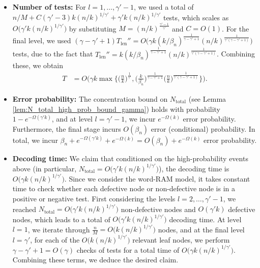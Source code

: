 \begin{itemize}
    \item \textbf{Number of tests:} For $l=1,\dots,\gamma'-1$, we used a total of $n/M+ C(\gamma'-3)k(n/k)^{1/\gamma'}+\gamma'k(n/k)^{1/\gamma'}$ tests, which scales as $O\big(\gamma'k(n/k)^{1/\gamma'}\big)$ by substituting $M=(n/k)^{\frac{\gamma'-1}{\gamma'}}$ and $C = O(1)$. For the final level, we used $(\gamma-\gamma'+1)T_{\text{len}}''=O\big(\gamma k(k/\beta_n)^{\frac{1}{\gamma-\gamma'+1}}(n/k)^{\frac{1}{\gamma'(\gamma-\gamma'+1)}}\big)$ tests, due to the fact that  $T_{\text{len}}''=k(k/\beta_n)^{\frac{1}{\gamma-\gamma'+1}}(n/k)^{\frac{1}{\gamma'(\gamma-\gamma'+1)}}$. Combining these, we obtain
    \begin{align}
        T&=O\bigg(\gamma k\max\bigg\{\Big(\frac{n}{k}\Big)^{\frac{1}{\gamma'}}
        ,\Big(\frac{k}{\beta_n}\Big)^{\frac{1}{\gamma-\gamma'+1}}\Big(\frac{n}{k}\Big)^{\frac{1}{\gamma'(\gamma-\gamma'+1)}}\bigg\}\bigg). \label{eq:splitting_algo__upper_bound}
    \end{align}
    \item \textbf{Error probability:} The concentration bound on $N_{\text{total}}$ (see Lemma \ref{lem:N_total_high_prob_bound_gamma}) holds with probability $1-e^{-\Omega(\gamma'k)}$, and at level $l=\gamma'-1$, we incur $e^{-\Omega(k)}$ error probability. Furthermore, the final stage incurs $O(\beta_n)$ error (conditional) probability. In total, we incur $\beta_n+e^{-\Omega(\gamma'k)}+e^{-\Omega(k)}=O(\beta_n)+e^{-\Omega(k)}$ error probability.
    \item \textbf{Decoding time:} We claim that conditioned on the high-probability events above (in particular, $N_{\text{total}}=O\big(\gamma'k(n/k)^{1/\gamma'}\big)$), the decoding time is $O\big(\gamma k(n/k)^{1/\gamma'}\big)$. Since we consider the word-RAM model, it takes constant time to check whether each defective node or non-defective node is in a positive or negative test. First considering the levels $l=2,\dotsc,\gamma'-1$, we reached $N_{\text{total}}=O\big(\gamma'k(n/k)^{1/\gamma'}\big)$ non-defective nodes and $O(\gamma'k)$ defective nodes, which leads to a total of $O\big(\gamma'k(n/k)^{1/\gamma'}\big)$ decoding time.  At level $l=1$, we iterate through $\frac{n}{M} = O\big(k(n/k)^{1/\gamma'}\big)$ nodes, and at the final level $l=\gamma'$, for each of the $O\big(k(n/k)^{1/\gamma'}\big)$ relevant leaf nodes, we perform $\gamma-\gamma'+1=O(\gamma)$ checks of tests for a total time of $O\big(\gamma k(n/k)^{1/\gamma'}\big)$. Combining these terms, we deduce the desired claim.

\end{itemize}
